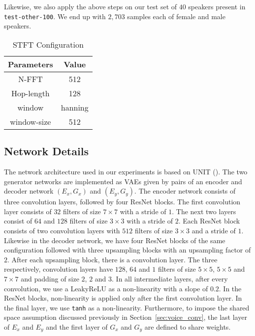 
Likewise, we also apply the above steps on our test set of $40$ speakers present in \texttt{test-other-100}. We end up with $2,703$ samples each of female and male speakers.


\begin{table}[]
    \centering
    \begin{tabular}{cc}
    \toprule
    \textbf{Parameters} & \textbf{Value}\\
    \midrule
         N-FFT&  512\\
         Hop-length& 128\\
         window& hanning\\
         window-size& 512\\
    \bottomrule     
    \end{tabular}
    \caption{STFT Configuration}
    \label{tab:stft}
\end{table}
\subsection{Network Details}
\label{sec:network_details}
The network architecture used in our experiments is based on UNIT (\cite{zhu2017unpaired}). The two generator networks are implemented as VAEs given by pairs of an encoder and decoder network $(E_x,G_x)$ and $(E_y,G_y)$. The encoder network consists of three convolution layers, followed by four ResNet blocks. The first convolution layer consists of $32$ filters of size $7\times 7$ with a stride of $1$. The next two layers consist of $64$ and $128$ filters of size $3\times 3$ with a stride of $2$. Each ResNet block consists of two convolution layers with $512$ filters of size $3\times 3$ and a stride of $1$. Likewise in the decoder network, we have four ResNet blocks of the same configuration followed with three upsampling blocks with an upsampling factor of $2$. After each upsampling block, there is a convolution layer. The three respectively, convolution layers have $128$, $64$ and $1$ filters of size $5\times 5$, $5\times 5$ and $7\times 7$ and padding of size $2$, $2$ and $3$. In all intermediate layers, after every convolution, we use a LeakyReLU as a non-linearity with a slope of $0.2$. In the ResNet blocks, non-linearity is applied only after the first convolution layer. In the final layer, we use \texttt{tanh} as a non-linearity. Furthermore, to impose the shared space assumption discussed previously in Section~\ref{sec:voice_conv}, the last layer of $E_x$ and $E_y$ and the first layer of $G_x$ and $G_y$ are defined to share weights. 


